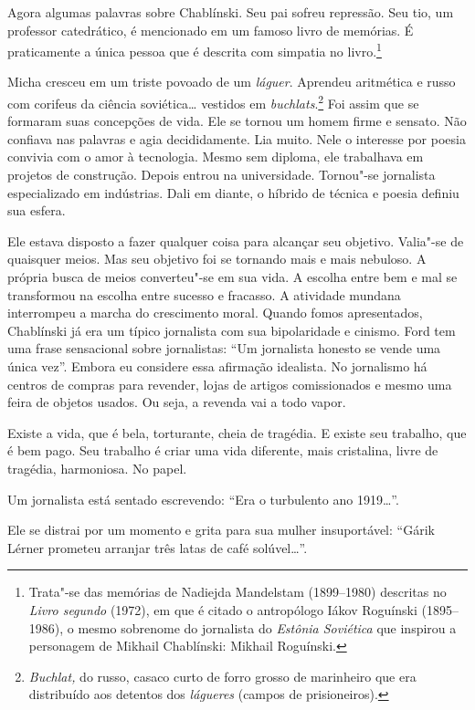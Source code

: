 Agora algumas palavras sobre Chablínski. Seu pai sofreu repressão. Seu
tio, um professor catedrático, é mencionado em um famoso livro de
memórias. É praticamente a única pessoa que é descrita com simpatia no
livro.\footnote{Trata"-se das memórias de Nadiejda Mandelstam (1899--1980)
  descritas no \emph{Livro segundo} (1972), em que é citado o
  antropólogo Iákov Roguínski (1895--1986), o mesmo sobrenome do
  jornalista do \emph{Estônia Soviética} que inspirou a personagem de
  Mikhail Chablínski: Mikhail Roguínski.}

Micha cresceu em um triste povoado de um \emph{láguer}. Aprendeu
aritmética e russo com corifeus da ciência soviética\ldots{} vestidos em
\emph{buchlats}.\footnote{\emph{Buchlat,} do russo, casaco curto de
  forro grosso de marinheiro que era distribuído aos detentos dos
  \emph{lágueres} (campos de prisioneiros).} Foi assim que se formaram
suas concepções de vida. Ele se tornou um homem firme e sensato. Não
confiava nas palavras e agia decididamente. Lia muito. Nele o interesse
por poesia convivia com o amor à tecnologia. Mesmo sem diploma, ele
trabalhava em projetos de construção. Depois entrou na universidade.
Tornou"-se jornalista especializado em indústrias. Dali em diante, o
híbrido de técnica e poesia definiu sua esfera.

Ele estava disposto a fazer qualquer coisa para alcançar seu objetivo.
Valia"-se de quaisquer meios. Mas seu objetivo foi se tornando mais e
mais nebuloso. A própria busca de meios converteu"-se em sua vida. A
escolha entre bem e mal se transformou na escolha entre sucesso e
fracasso. A atividade mundana interrompeu a marcha do crescimento moral.
Quando fomos apresentados, Chablínski já era um típico jornalista com
sua bipolaridade e cinismo. Ford tem uma frase sensacional sobre
jornalistas: ``Um jornalista honesto se vende uma única vez''. Embora eu
considere essa afirmação idealista. No jornalismo há centros de compras
para revender, lojas de artigos comissionados e mesmo uma feira de
objetos usados. Ou seja, a revenda vai a todo vapor.

Existe a vida, que é bela, torturante, cheia de tragédia. E existe seu
trabalho, que é bem pago. Seu trabalho é criar uma vida diferente, mais
cristalina, livre de tragédia, harmoniosa. No papel.

Um jornalista está sentado escrevendo: ``Era o turbulento ano 1919\ldots{}''.

Ele se distrai por um momento e grita para sua mulher insuportável:
``Gárik Lérner prometeu arranjar três latas de café solúvel\ldots{}''.

